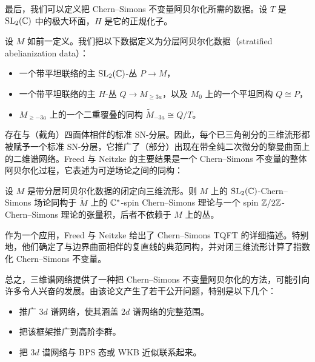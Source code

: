 最后，我们可以定义把 Chern–Simons 不变量阿贝尔化所需的数据。设 $T$ 是 $\operatorname{SL}_2(\mathbb{C})$ 中的极大环面，$H$ 是它的正规化子。

\begin{definition}[{{{{{[138, 定义 4.24 (ii)]}}}}}]
设 $M$ 如前一定义。我们把以下数据定义为分层阿贝尔化数据（stratified abelianization data）：
\begin{itemize}
\item 一个带平坦联络的主 $\operatorname{SL}_2(\mathbb{C})$-丛 $P\to M$，
\item 一个带平坦联络的主 $H$-丛 $Q\to M_{\ge 3a}$，以及 $M_0$ 上的一个平坦同构 $Q\cong P$，
\item $M_{\ge -3a}$ 上的一个二重覆叠的同构 $\widetilde{M}_{-3a}\cong Q/T$。
\end{itemize}
\end{definition}

存在与（截角）四面体相伴的标准 SN-分层。因此，每个已三角剖分的三维流形都被赋予一个标准 SN-分层，它推广了（部分）出现在带全纯二次微分的黎曼曲面上的二维谱网络。Freed 与 Neitzke 的主要结果是一个 Chern–Simons 不变量的整体阿贝尔化过程，它表述为可逆场论之间的同构：

\begin{theorem}[{{{{{[138, 定理 5.106]}}}}}]
设 $M$ 是带分层阿贝尔化数据的闭定向三维流形。则 $M$ 上的 $\operatorname{SL}_2(\mathbb{C})$-Chern–Simons 场论同构于 $\widetilde{M}$ 上的 $\mathbb{C}^*$-spin Chern–Simons 理论与一个 spin $\mathbb{Z}/2\mathbb{Z}$-Chern–Simons 理论的张量积，后者不依赖于 $M$ 上的丛。
\end{theorem}

作为一个应用，Freed 与 Neitzke 给出了 Chern–Simons TQFT 的详细描述。特别地，他们确定了与边界曲面相伴的复直线的典范同构，并对闭三维流形计算了指数化 Chern–Simons 不变量。

总之，三维谱网络提供了一种把 Chern–Simons 不变量阿贝尔化的方法，可能引向许多令人兴奋的发展。由该论文产生了若干公开问题，特别是以下几个：
\begin{itemize}
\item 推广 $3d$ 谱网络，使其涵盖 $2d$ 谱网络的完整范围。
\item 把该框架推广到高阶李群。
\item 把 $3d$ 谱网络与 BPS 态或 WKB 近似联系起来。
\end{itemize}
